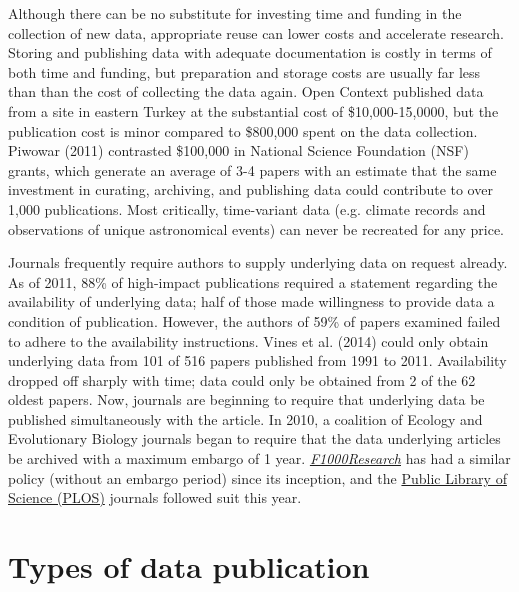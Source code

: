 \documentclass[10pt,twocolumn]{article}
\begin{document}
Although there can be no substitute for investing time and funding in the collection of new data, appropriate reuse can lower costs and accelerate research. 
Storing and publishing data with adequate documentation is costly in terms of both time and funding, but preparation and storage costs are usually far less than than the cost of collecting the data again.
Open Context published data from a site in eastern Turkey at the substantial cost of \$10,000-15,0000, but the publication cost is minor compared to \$800,000 spent on the data collection.\cite{kansa_we_2014}
Piwowar (2011) contrasted \$100,000 in National Science Foundation (NSF) grants, which generate an average of 3-4 papers with an estimate that the same investment in curating, archiving, and publishing data could contribute to over 1,000 publications.\cite{piwowar_data_2011}
Most critically, time-variant data (e.g. climate records and observations of unique astronomical events) can never be recreated for any price.\cite{gray_online_2002}

Journals frequently require authors to supply underlying data on request already.
As of 2011, 88\% of high-impact publications required a statement regarding the availability of underlying data; half of those made willingness to provide data a condition of publication.\cite{alsheikh-ali_public_2011}
However, the authors of 59\% of papers examined failed to adhere to the availability instructions.
Vines et al. (2014)\cite{vines_availability_2014} could only obtain underlying data from 101 of 516 papers published from 1991 to 2011.
Availability dropped off sharply with time; data could only be obtained from 2 of the 62 oldest papers.
Now, journals are beginning to require that underlying data be published simultaneously with the article.
In 2010, a coalition of Ecology and Evolutionary Biology journals began to require that the data underlying articles be archived with a maximum embargo of 1 year.\cite{whitlock_data_2010, fairbairn_advent_2010}
\href{http://f1000research.com}{\emph{F1000Research}} has had a similar policy (without an embargo period) since its inception, and the {\href{http://www.plos.org/}{Public Library of Science (PLOS)}} journals followed suit this year.\cite{bloom_data_2014}

\section*{Types of data publication}\label{types-of-data-publication}
\end{document}

